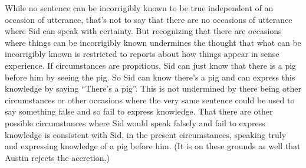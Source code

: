While no sentence can be incorrigibly known to be true independent of an occasion of utterance, that's not to say that there are no occasions of utterance where Sid can speak with certainty. But recognizing that there are occasions where things can be incorrigibly known undermines the thought that what can be incorrigibly known is restricted to reports about how things appear in sense experience. %
If circumstances are propitious, Sid can just know that there is a pig before him by seeing the pig. So Sid can know there's a pig and can express this knowledge by saying ``There's a pig''. This is not undermined by there being other circumstances or other occasions where the very same sentence could be used to say something false and so fail to express knowledge. That there are other possible circumstances where Sid would speak falsely and fail to express knowledge is consistent with Sid, in the present circumstances, speaking truly and expressing knowledge of a pig before him. (It is on these grounds as well that Austin rejects the accretion.)


